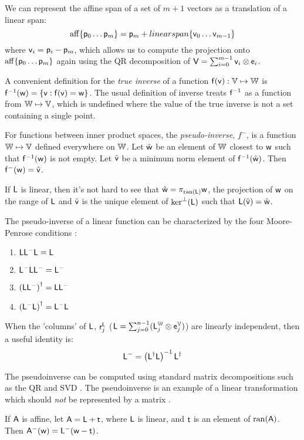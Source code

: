 We can represent the affine span of a set of $m+1$ vectors
as a translation of a linear span:
\begin{equation}
\mathrm{aff}\{ \mathsf{p}_0 \ldots \mathsf{p}_{m} \} = \mathsf{p}_m + \\linearspan\{\mathsf{v}_0 \ldots \mathsf{v}_{m-1}\}
\end{equation}
where $\mathsf{v}_i = \mathsf{p}_i - \mathsf{p}_m$,
which allows us to compute the projection onto
$\mathrm{aff}\{ \mathsf{p}_0 \ldots \mathsf{p}_{m} \}$
again using the QR decomposition
of $\mathsf{V} = \sum_{i=0}^{m-1} \mathsf{v}_i \otimes \mathsf{e}_i$.

\label{sec:Inverses-and-pseudo-inverses}

A convenient definition for the {\it true inverse}
of a function $\mathsf{f}(\mathsf{v}):\mathbb{V} \mapsto \mathbb{W}$ is
$\mathsf{f}^{-1}(\mathsf{w}) = \{ \mathsf{v} : \mathsf{f}(\mathsf{v}) = \mathsf{w} \}$.
The usual definition of inverse treats $\mathsf{f}^{-1}$
as a function from $\mathbb{W} \mapsto \mathbb{V}$,
which is undefined where the value of the true
inverse is not a set containing a single point.

For functions between inner product spaces,
the {\it pseudo-inverse}, $f^{-}$, is a function $\mathbb{W} \mapsto \mathbb{V}$
defined everywhere on $\mathbb{W}$.
Let $\hat{\mathsf{w}}$ be an element of $\mathbb{W}$ closest to $\mathsf{w}$
such that $\mathsf{f}^{-1}(\mathsf{w})$ is not empty.
Let $\hat{\mathsf{v}}$ be a minimum norm element of $\mathsf{f}^{-1}(\hat{\mathsf{w}})$.
Then $\mathsf{f}^{-}(\mathsf{w}) = \hat{\mathsf{v}}$.

If $\mathsf{L}$ is linear, then it's not hard to see that
$\hat{\mathsf{w}} = \pi_{\mathrm{ran}(\mathsf{L})} \mathsf{w}$, the projection of $\mathsf{w}$
on the range of $\mathsf{L}$
and
$\hat{\mathsf{v}}$ is the unique element of $\mathrm{ker}^{\perp}(\mathsf{L})$
such that $\mathsf{L}(\hat{\mathsf{v}}) = \hat{\mathsf{w}}$.

The pseudo-inverse of a linear function can be characterized
by the four Moore-Penrose conditions
\cite[See][sec. 5.5.2]{golub-vanloan-2012}:
\begin{enumerate}
\item $\mathsf{L} \mathsf{L}^{-} \mathsf{L} = \mathsf{L}$
\item $\mathsf{L}^{-} \mathsf{L} \mathsf{L}^{-} = \mathsf{L}^{-}$
\item $\left( \mathsf{L} \mathsf{L}^{-} \right)^{\dagger} = \mathsf{L} \mathsf{L}^{-}$
\item $\left( \mathsf{L}^{-} \mathsf{L} \right)^{\dagger} = \mathsf{L}^{-} \mathsf{L}$
\end{enumerate}

When the 'columns' of $\mathsf{L}$, $\mathsf{r}_j^{\mathsf{L}}$
($\mathsf{L} = \sum_{j=0}^{n-1} ( \mathsf{L}_j^{\mathbb{W}} \otimes \mathsf{e}_j^{\mathbb{V}} )$)
are linearly independent,
then a useful identity is:
\begin{equation}
\label{eq:full-rank-pseudo-inverse}
\mathsf{L}^{-} = \left( \mathsf{L}^{\dagger} \mathsf{L} \right)^{-1} \mathsf{L}^{\dagger}
\end{equation}

The pseudoinverse can be computed
using standard matrix decompositions such as
the QR and SVD \cite{golub-vanloan-2012}.
The pseudoinverse is an example of a linear transformation
which should {\em not} be represented by a matrix
\cite{mcdonald-1989b}.

If $\mathsf{A}$ is affine,
let $\mathsf{A} = \mathsf{L} + \mathsf{t}$,
where $\mathsf{L}$ is linear,
and $\mathsf{t}$ is an element of $\mathrm{ran}(\mathsf{A})$.
Then $\mathsf{A}^{-}(\mathsf{w}) = \mathsf{L}^{-}( \mathsf{w} - \mathsf{t} )$.

